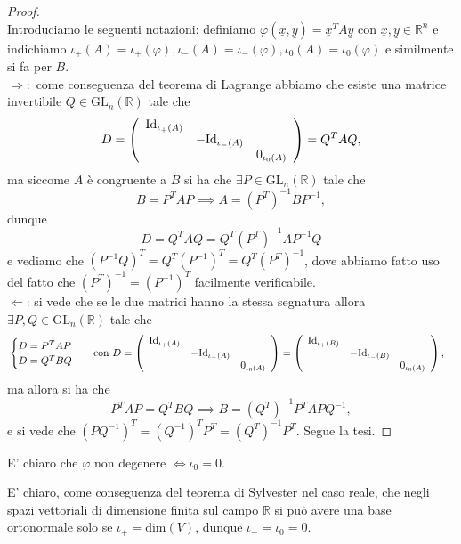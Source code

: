 \begin{proof} \hspace{1cm} \\
	Introduciamo le seguenti notazioni: definiamo $\varphi(\underline{x}, \underline{y}) = \underline{x}^T A \underline{y}$ con $\underline{x}, \underline{y} \in \mathbb{R}^n$ e indichiamo $\iota_+(A) = \iota_+(\varphi), \iota_-(A) = \iota_-(\varphi), \iota_0(A) = \iota_0(\varphi)$ e similmente si fa per $B$. \\
	$\boxed{\Rightarrow}:$ come conseguenza del teorema di Lagrange abbiamo che esiste una matrice invertibile $Q \in \text{GL}_n(\mathbb{R})$ tale che 
	$$
		D = \left( \begin{array}{c c c} \text{Id}_{\iota_+(A)} &  &  \\
		& -\text{Id}_{\iota_-(A)} &  \\ 
		& & 0_{\iota_0(A)}
		\end{array} \right) = Q^T A Q,
	$$
	ma siccome $A$ è congruente a $B$ si ha che $\exists P \in \text{GL}_n(\mathbb{R})$ tale che
	$$
		B = P^T A P \implies A = (P^T)^{-1} B P^{-1},
	$$
	dunque 
	$$
		D = Q^T A Q = Q^T (P^T)^{-1} A P^{-1} Q
	$$
	e vediamo che $(P^{-1} Q)^T = Q^T (P^{-1})^T = Q^T (P^T)^{-1}$, dove abbiamo fatto uso del fatto che $(P^T)^{-1} = (P^{-1})^T$ facilmente verificabile. \\
	$\boxed{\Leftarrow}$: si vede che se le due matrici hanno la stessa segnatura allora $\exists P, Q \in \text{GL}_n(\mathbb{R})$ tale che
	\begin{align}
		&\begin{cases} 
			D = P^T A P \\
			D = Q^T B Q
		\end{cases} & &\text{con } D = \left( \begin{array}{c c c} \text{Id}_{\iota_+(A)} &  &  \\
		& -\text{Id}_{\iota_-(A)} &  \\ 
		& & 0_{\iota_0(A)}
		\end{array} \right) = \left( \begin{array}{c c c} \text{Id}_{\iota_+(B)} &  &  \\
		& -\text{Id}_{\iota_-(B)} &  \\ 
		& & 0_{\iota_0(A)}
		\end{array} \right),
	\end{align}
	ma allora si ha che
	$$
		P^T A P = Q^T B Q \implies B = (Q^{T})^{-1} P^T A P Q^{-1},
	$$
	e si vede che $(PQ^{-1})^T = (Q^{-1})^T P^T = (Q^T)^{-1} P^T$. Segue la tesi.
\end{proof}
\begin{remark}
	E' chiaro che $\varphi$ non degenere $\iff \iota_0 = 0$.
\end{remark}
\begin{remark}
	E' chiaro, come conseguenza del teorema di Sylvester nel caso reale, che negli spazi vettoriali di dimensione finita sul campo $\mathbb{R}$ si può avere una base ortonormale solo se $\iota_+ = \text{dim}(V)$, dunque $\iota_- = \iota_0 = 0$.
\end{remark}

